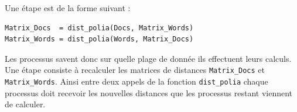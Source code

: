Une étape est de la forme suivant :

\begin{verbatim}
Matrix_Docs  = dist_polia(Docs, Matrix_Words)
Matrix_Words = dist_polia(Words, Matrix_Docs)
\end{verbatim}

Les processus savent donc sur quelle plage de donnée
ils effectuent leurs calculs.
Une étape consiste à recalculer les matrices de distances
{\tt Matrix\_Docs} et {\tt Matrix\_Words}.
Ainsi entre deux appels de la fonction {\tt dist\_polia}
chaque processus doit recevoir les nouvelles distances que
les processus restant viennent de calculer.
